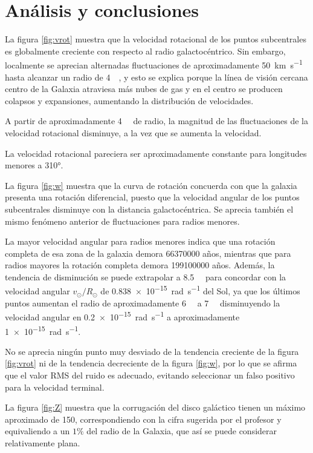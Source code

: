 \section{Análisis y conclusiones}

La figura \ref{fig:vrot} muestra que la velocidad rotacional de los puntos subcentrales es globalmente creciente con respecto al radio galactocéntrico. Sin embargo, localmente se aprecian alternadas fluctuaciones de aproximadamente \SI{50}{\kilo\metre\per\second} hasta alcanzar un radio de \SI{4}{\kilo\parsec}, y esto se explica porque la línea de visión cercana centro de la Galaxia atraviesa más nubes de gas y en el centro se producen colapsos y expansiones, aumentando la distribución de velocidades.

A partir de aproximadamente \SI{4}{\kilo\parsec} de radio, la magnitud de las fluctuaciones de la velocidad rotacional disminuye, a la vez que se aumenta la velocidad.

La velocidad rotacional pareciera ser aproximadamente constante para longitudes menores a \ang{310}.

La figura \ref{fig:w} muestra que la curva de rotación concuerda con que la galaxia presenta una rotación diferencial, puesto que la velocidad angular de los puntos subcentrales disminuye con la distancia galactocéntrica. Se aprecia también el mismo fenómeno anterior de fluctuaciones para radios menores.

La mayor velocidad angular para radios menores indica que una rotación completa de esa zona de la galaxia demora 66370000 años, mientras que para radios mayores la rotación completa demora 199100000 años. Además, la tendencia de disminución se puede extrapolar a \SI{8.5}{\kilo\parsec} para concordar con la velocidad angular $v_\odot/R_\odot$ de \SI{0.838e-15}{\radian\per\second} del Sol, ya que los últimos puntos aumentan el radio de aproximadamente \SI{6}{\kilo\parsec} a \SI{7}{\kilo\parsec} disminuyendo la velocidad angular en \SI{0.2e-15}{\radian\per\second} a aproximadamente \SI{1e-15}{\radian\per\second}.

No se aprecia ningún punto muy desviado de la tendencia creciente de la figura \ref{fig:vrot} ni de la tendencia decreciente de la figura \ref{fig:w}, por lo que se afirma que el valor RMS del ruido es adecuado, evitando seleccionar un falso positivo para la velocidad terminal.

La figura \ref{fig:Z} muestra que la corrugación del disco galáctico tienen un máximo aproximado de \SI{150}{\parsec}, correspondiendo con la cifra sugerida por el profesor y equivaliendo a un $1\%$ del radio de la Galaxia, que así se puede considerar relativamente plana.

